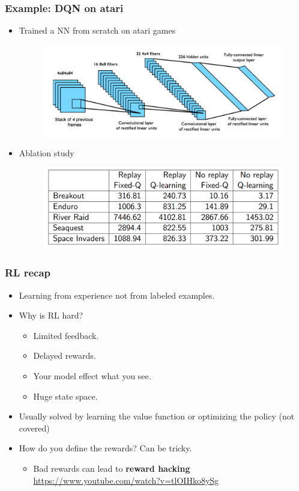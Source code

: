 \documentclass{beamer}
\renewcommand{\high}{\textbf}
\begin{document}
\begin{frame}\frametitle{Example: DQN on atari}\small
\begin{itemize}
    \item Trained a NN from scratch on atari games 

\begin{figure}
    \includegraphics[width=0.75\linewidth]{Figures/DQN_arc}
\end{figure}
\item Ablation study
\begin{figure}
    \includegraphics[width=0.75\linewidth]{Figures/ablation}
\end{figure}
\end{itemize}
\end{frame}


\begin{frame}\frametitle{RL recap}\small

\begin{itemize}
    \item Learning from experience not from labeled examples.
    \item Why is RL hard?
    \begin{itemize}
        \item Limited feedback.
        \item Delayed rewards.
        \item Your model effect what you
         see.
        \item Huge state space.
    \end{itemize}
     \item Usually solved by learning the value function or optimizing the policy (not covered)
     \item How do you define the rewards? Can be tricky.
    \begin{itemize}
        \item Bad rewards can lead to \high{reward hacking}
        \url{https://www.youtube.com/watch?v=tlOIHko8ySg}
    \end{itemize}
\end{itemize}
\end{frame}
\end{document}
